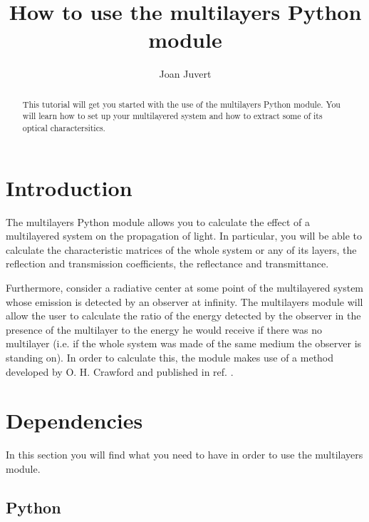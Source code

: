 \documentclass[a4paper,11pt,aps,final]{revtex4}
\begin{document}
\title{How to use the \textsf{multilayers} \textsf{Python} module}
\author{Joan Juvert}

\begin{abstract}

This tutorial will get you started with the use of the \textsf{multilayers} \textsf{Python} module. You will learn how to set up your multilayered system and how to extract some of its optical charactersitics.

\end{abstract}

\maketitle

\section{Introduction}

The \textsf{multilayers} \textsf{Python} module allows you to calculate the effect of a multilayered system on the propagation of light. In particular, you will be able to calculate the characteristic matrices of the whole system or any of its layers, the reflection and transmission coefficients, the reflectance and transmittance\cite{born00}.

Furthermore, consider a radiative center at some point of the multilayered system whose emission is detected by an observer at infinity. The \textsf{multilayers} module will allow the user to calculate the ratio of the energy detected by the observer in the presence of the multilayer to the energy he would receive if there was no multilayer (i.e. if the whole system was made of the same medium the observer is standing on). In order to calculate this, the module makes use of a method developed by O. H. Crawford and published in ref. .

\section{Dependencies}

In this section you will find what you need to have in order to use the \textsf{multilayers} module.

\subsection{\textsf{Python}}
\end{document}
